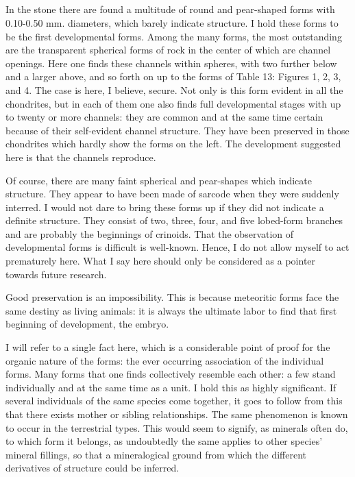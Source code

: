 \documentclass[a4paper, 12pt, oneside]{article}
\begin{document}
\subsection{}
\paragraph*{}
In the stone there are found a multitude of round and pear-shaped forms with 0.10-0.50 mm. diameters, which barely indicate structure. I hold these forms to be the first developmental forms. Among the many forms, the most outstanding are the transparent spherical forms of rock in the center of which are channel openings. Here one finds these channels within spheres, with two further below and a larger above, and so forth on up to the forms of Table 13: Figures 1, 2, 3, and 4. The case is here, I believe, secure. Not only is this form evident in all the chondrites, but in each of them one also finds full developmental stages with up to twenty or more channels: they are common and at the same time certain because of their self-evident channel structure. They have been preserved in those chondrites which hardly show the forms on the left. The development suggested here is that the channels reproduce.

Of course, there are many faint spherical and pear-shapes which indicate structure. They appear to have been made of sarcode when they were suddenly interred. I would not dare to bring these forms up if they did not indicate a definite structure. They consist of two, three, four, and five lobed-form branches and are probably the beginnings of crinoids. That the observation of developmental forms is difficult is well-known. Hence, I do not allow myself to act prematurely here. What I say here should only be considered as a pointer towards future research.

Good preservation is an impossibility. This is because meteoritic forms face the same destiny as living animals: it is always the ultimate labor to find that first beginning of development, the embryo.

I will refer to a single fact here, which is a considerable point of proof for the organic nature of the forms: the ever occurring association of the individual forms. Many forms that one finds collectively resemble each other: a few stand individually and at the same time as a unit. I hold this as highly significant. If several individuals of the same species come together, it goes to follow from this that there exists mother or sibling relationships. The same phenomenon is known to occur in the terrestrial types. This would seem to signify, as minerals often do, to which form it belongs, as undoubtedly the same applies to other species' mineral fillings, so that a mineralogical ground from which the different derivatives of structure could be inferred.
\clearpage
\end{document}
